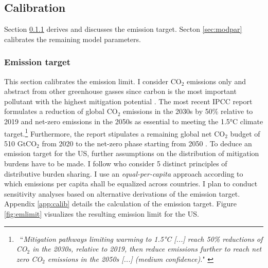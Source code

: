 \subsection{Calibration}\label{sec:calib}

Section \ref{sec:ems} derives and discusses the emission target. 
Secton \ref{sec:modpar} calibrates the remaining model parameters.

\subsubsection{Emission target}\label{sec:ems}
This section calibrates the emission limit. I consider CO$_2$ emissions only and abstract from other greenhouse gasses since carbon is the most important pollutant with the highest mitigation potential \citep[p.29]{IPCC2022}.
The most recent IPCC report \citep{IPCC2022} formulates a reduction of global CO$_2$ emissions in the 2030s by 50\% relative to 2019 and net-zero emissions in the 2050s  as essential to meeting the 1.5°C climate target.\footnote{\ ``\textit{Mitigation pathways limiting warming to 1.5°C [...] reach 50\% reductions of CO$_2$ in the 2030s, relative to 2019, then reduce emissions further to reach net zero CO$_2$ emissions in the 2050s [...] (\textnormal{medium confidence}).}" \citep[p.5, Chapter 3]{IPCC2022} }  Furthermore, the report stipulates a remaining global net CO$_2$ budget of 510 GtCO$_2$ %
from 2020 to the net-zero phase starting from 2050 \citep[p.5, Chapter 3]{IPCC2022}. 
To deduce an emission target for the US, further assumptions on the distribution of mitigation burdens have to be made. I follow \cite{RobiouDuPont2017EquitableGoals} who consider 5 distinct principles of distributive burden sharing. I use an \textit{equal-per-capita} approach according to which emissions per capita shall be equalized across countries. 
I plan to conduct sensitivity analyses based on alternative derivations of the emission target. Appendix \ref{app:calib} details the calculation of the emission target. 
Figure \ref{fig:emlimit}  visualizes the resulting emission limit for the US.

